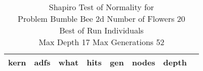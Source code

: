 \begin{table}[H]
\caption{Shapiro Test of Normality for \\ Problem  Bumble Bee 2d  Number of Flowers 20\\Best of Run Individuals \\ Max Depth 17 Max Generations 52\\}
\begin{center}
\scalebox{0.8} %
{
\begin{tabular}{lrrrrrrr}
\hline
kern & adfs & what & hits & gen & nodes & depth \\
\hline


\end{tabular}
}
\end{center}
\end{table}

